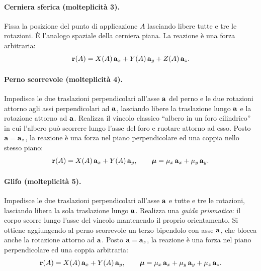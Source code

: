 \paragraph{Cerniera sferica (molteplicità 3).}
Fissa la posizione del punto di applicazione $A$
lasciando libere tutte e tre le rotazioni. È
l'analogo spaziale della cerniera piana. La reazione
è una forza arbitraria:
\begin{equation}
	\mathbf{r}(A) = X(A)\,\mathbf{a}_x + Y(A)\,\mathbf{a}_y + Z(A)\,\mathbf{a}_z.
\end{equation}

\paragraph{Perno scorrevole (molteplicità 4).}
Impedisce le due traslazioni perpendicolari all'asse
$\mathbf{a}$ del perno e le due rotazioni attorno agli assi perpendicolari
ad $\mathbf{a}$, lasciando libere la traslazione lungo $\mathbf{a}$ e
la rotazione attorno ad $\mathbf{a}$. Realizza il vincolo
classico ``albero in un foro cilindrico'' in cui l'albero
può scorrere lungo l'asse del foro e ruotare attorno ad
esso. Posto $\mathbf{a} = \mathbf{a}_z$, la reazione è una forza nel
piano perpendicolare ed una coppia nello stesso piano:
\begin{equation}
	\mathbf{r}(A) = X(A)\,\mathbf{a}_x + Y(A)\,\mathbf{a}_y,
	\qquad
	\bm{\mu} = \mu_x\,\mathbf{a}_x + \mu_y\,\mathbf{a}_y.
\end{equation}

\paragraph{Glifo (molteplicità 5).}
Impedisce le due traslazioni perpendicolari all'asse $\mathbf{a}$
e tutte e tre le rotazioni, lasciando libera la sola
traslazione lungo $\mathbf{a}$. Realizza una \emph{guida
	prismatica}: il corpo scorre lungo l'asse del vincolo
mantenendo il proprio orientamento. Si ottiene aggiungendo
al perno scorrevole un terzo bipendolo con asse $\mathbf{a}$, che
blocca anche la rotazione attorno ad $\mathbf{a}$. Posto $\mathbf{a} =
\mathbf{a}_z$, la reazione è una forza nel piano perpendicolare
ed una coppia arbitraria:
\begin{equation}
	\mathbf{r}(A) = X(A)\,\mathbf{a}_x + Y(A)\,\mathbf{a}_y,
	\qquad
	\bm{\mu} = \mu_x\,\mathbf{a}_x + \mu_y\,\mathbf{a}_y + \mu_z\,\mathbf{a}_z.
\end{equation}


